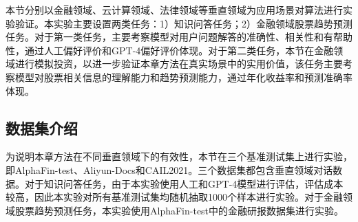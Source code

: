 本节分别以金融领域、云计算领域、法律领域等垂直领域为应用场景对算法进行实验验证。本实验主要设置两类任务：1）知识问答任务；2）金融领域股票趋势预测任务。对于第一类任务，主要考察模型对用户问题解答的准确性、相关性和有帮助性，通过人工偏好评价和GPT-4偏好评价体现。对于第二类任务，本节在金融领域进行模拟投资，以进一步验证本章方法在真实场景中的实用价值，该任务主要考察模型对股票相关信息的理解能力和趋势预测能力，通过年化收益率和预测准确率体现。


\subsection{数据集介绍}

为说明本章方法在不同垂直领域下的有效性，本节在三个基准测试集上进行实验，即AlphaFin-test、Aliyun-Docs和CAIL2021\cite{zhong2019jec}。三个数据集都包含垂直领域对话数据。对于知识问答任务，由于本实验使用人工和GPT-4模型进行评估，评估成本较高，因此本实验对所有基准测试集均随机抽取1000个样本进行实验。对于金融领域股票趋势预测任务，本实验使用AlphaFin-test中的金融研报数据集进行实验。


